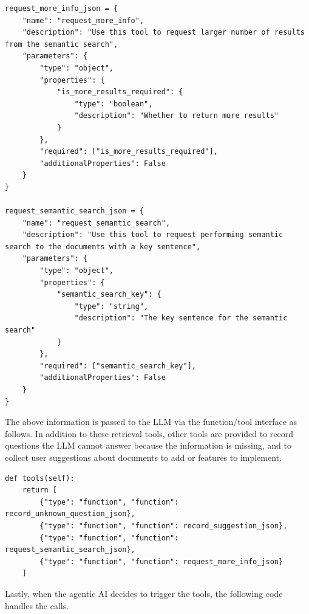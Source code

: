 \begin{lstlisting}
request_more_info_json = {
    "name": "request_more_info",
    "description": "Use this tool to request larger number of results from the semantic search",
    "parameters": {
        "type": "object",
        "properties": {
            "is_more_results_required": {
                "type": "boolean",
                "description": "Whether to return more results"
            }
        },
        "required": ["is_more_results_required"],
        "additionalProperties": False
    }
}

request_semantic_search_json = {
    "name": "request_semantic_search",
    "description": "Use this tool to request performing semantic search to the documents with a key sentence",
    "parameters": {
        "type": "object",
        "properties": {
            "semantic_search_key": {
                "type": "string",
                "description": "The key sentence for the semantic search"
            }
        },
        "required": ["semantic_search_key"],
        "additionalProperties": False
    }
}
\end{lstlisting}

The above information is passed to the LLM via the function/tool interface as follows. In addition to these retrieval tools, other tools are provided to record questions the LLM cannot answer because the information is missing, and to collect user suggestions about documents to add or features to implement.

\begin{lstlisting}
def tools(self):
    return [
        {"type": "function", "function": record_unknown_question_json},
        {"type": "function", "function": record_suggestion_json},
        {"type": "function", "function": request_semantic_search_json},
        {"type": "function", "function": request_more_info_json}
    ]
\end{lstlisting}

Lastly, when the agentic AI decides to trigger the tools, the following code handles the calls.

